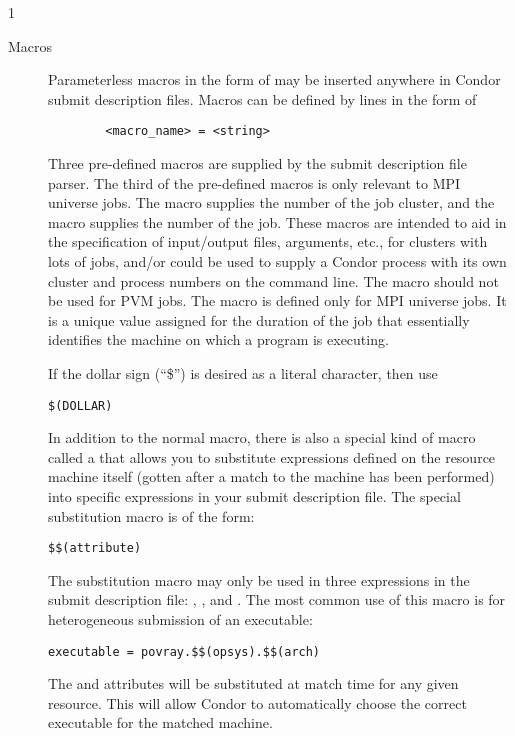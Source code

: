 \begin{ManPage}{\label{man-condor-submit}}{1}
\begin{description}
\item[Macros] Parameterless macros in the form of 
may be inserted anywhere in Condor submit description files. Macros can be
defined by lines in the form of 
\begin{verbatim} 
        <macro_name> = <string> 
\end{verbatim} 
Three pre-defined macros are supplied by the submit description file parser.
The third of the pre-defined macros is only relevant to MPI universe
jobs.
The
 macro supplies the number of the job cluster, and the
 macro supplies the number of the job. These macros are
intended to aid in the specification of input/output files, arguments,
etc., for clusters with lots of jobs, and/or could be used to supply a
Condor process with its own cluster and process numbers on the command
line.  The  macro should not be used for PVM jobs.
The 
 macro is defined only for MPI universe jobs.
It is a unique value assigned for the duration of the job
that essentially identifies the machine on which a program is
executing.

If the dollar sign (``\$'') is desired as a literal character,
then use
\begin{verbatim}
$(DOLLAR)
\end{verbatim}

In addition to the normal macro, there is also a special kind of macro
called a  that allows you to substitute
expressions defined on the resource machine itself (gotten after a match
to the machine has been performed) into specific expressions in your
submit description file. The special substitution macro is of the form:
\begin{verbatim} 
$$(attribute)
\end{verbatim}

The substitution macro may only be used in three expressions in the
submit description file: , , and
. The most common use of this macro is for heterogeneous
submission of an executable:
\begin{verbatim}
executable = povray.$$(opsys).$$(arch)
\end{verbatim}
The  and  attributes will be substituted at
match time for any given resource. This will allow Condor to automatically
choose the correct executable for the matched machine.


\end{description}
\end{ManPage}
